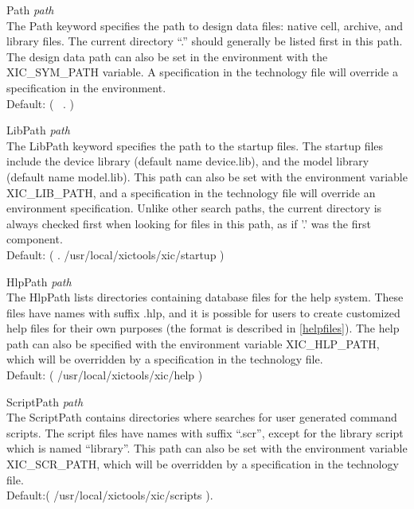 \begin{description}
\item{\vt Path} {\it path}\\
The {\vt Path} keyword specifies the path to design data files: 
native cell, archive, and library files.  The current directory ``.''
should generally be listed first in this path.  The design data path can
also be set in the environment with the {\vt XIC\_SYM\_PATH} variable. 
A specification in the technology file will override a specification
in the environment.\\
Default:  {\vt ( ~.  )}

\item{\vt LibPath} {\it path}\\
The {\vt LibPath} keyword specifies the path to the startup files. 
The startup files include the device library (default name {\vt
device.lib}), and the model library (default name {\vt model.lib}). 
This path can also be set with the environment variable {\et
XIC\_LIB\_PATH}, and a specification in the technology file will
override an environment specification.  Unlike other search paths, the
current directory is always checked first when looking for files in
this path, as if '.' was the first component.\\
Default: {\vt ( .  /usr/local/xictools/xic/startup )}

\item{\vt HlpPath} {\it path}\\
The {\vt HlpPath} lists directories containing database files for the
help system.  These files have names with suffix {\vt .hlp}, and it is
possible for users to create customized help files for their own
purposes (the format is described in \ref{helpfiles}).  The help path
can also be specified with the environment variable {\et
XIC\_HLP\_PATH}, which will be overridden by a specification in the
technology file.\\
Default: {\vt ( /usr/local/xictools/xic/help )}

\item{\vt ScriptPath} {\it path}\\
The {\vt ScriptPath} contains directories where {\Xic} searches for
user generated command scripts.  The script files have names with
suffix ``{\vt .scr}'', except for the library script which is named
``{\vt library}''.  This path can also be set with the environment
variable {\et XIC\_SCR\_PATH}, which will be overridden by a
specification in the technology file.\\
Default:{\vt ( /usr/local/xictools/xic/scripts )}.
\end{description}

